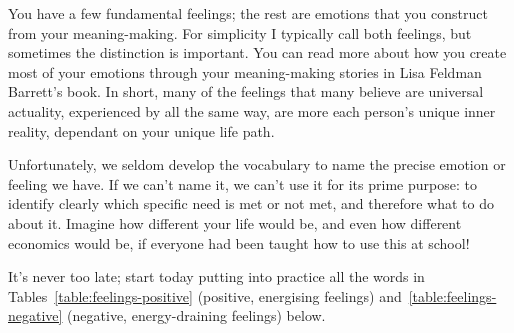 You have a few fundamental feelings; the rest are emotions that you construct from your meaning\hyp{}making. For simplicity I typically call both feelings, but sometimes the distinction is important. You can read more about how you create most of your emotions through your meaning\hyp{}making stories in Lisa Feldman Barrett’s book\cite{barrett-emotions}. In short, many of the feelings that many believe are universal actuality, experienced by all the same way, are more each person’s unique inner reality, dependant on your unique life path. 


Unfortunately, we seldom develop the vocabulary to name the precise emotion or feeling we have. If we can't name it, we can't use it for its prime purpose: to identify clearly which specific need is met or not met, and therefore what to do about it. Imagine how different your life would be, and even how different economics would be, if everyone had been taught how to use this at school! 


It’s never too late; start today putting into practice all the words in Tables~\ref{table:feelings-positive} (positive, energising feelings) and~\ref{table:feelings-negative} (negative, energy-draining feelings) below. 




